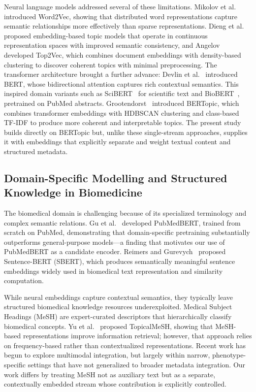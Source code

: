 \documentclass[authorproof,JACIII,researchpaper]{fujipressarticle}
\begin{document}
Neural language models addressed several of these limitations. Mikolov et al.~\cite{mikolov_efficient_2013} introduced Word2Vec, showing that distributed word representations capture semantic relationships more effectively than sparse representations. Dieng et al.~\cite{dieng_topic_2020} proposed embedding-based topic models that operate in continuous representation spaces with improved semantic consistency, and Angelov~\cite{angelov_top2vec_2020} developed Top2Vec, which combines document embeddings with density-based clustering to discover coherent topics with minimal preprocessing. The transformer architecture brought a further advance: Devlin et al.~\cite{devlin_bert_2019} introduced BERT, whose bidirectional attention captures rich contextual semantics. This inspired domain variants such as SciBERT~\cite{beltagy_scibert_2019} for scientific text and BioBERT~\cite{lee_biobert_2020}, pretrained on PubMed abstracts. Grootendorst~\cite{grootendorst_bertopic_2022} introduced BERTopic, which combines transformer embeddings with HDBSCAN clustering and class-based TF-IDF to produce more coherent and interpretable topics. The present study builds directly on BERTopic but, unlike these single-stream approaches, supplies it with embeddings that explicitly separate and weight textual content and structured metadata.

\subsection{Domain-Specific Modelling and Structured Knowledge in Biomedicine}

The biomedical domain is challenging because of its specialized terminology and complex semantic relations. Gu et al.~\cite{gu_domain_2022} developed PubMedBERT, trained from scratch on PubMed, demonstrating that domain-specific pretraining substantially outperforms general-purpose models---a finding that motivates our use of PubMedBERT as a candidate encoder. Reimers and Gurevych~\cite{reimers_sentence-bert_2019} proposed Sentence-BERT (SBERT), which produces semantically meaningful sentence embeddings widely used in biomedical text representation and similarity computation.

While neural embeddings capture contextual semantics, they typically leave structured biomedical knowledge resources underexploited. Medical Subject Headings (MeSH) are expert-curated descriptors that hierarchically classify biomedical concepts. Yu et al.~\cite{yu_improving_2016} proposed TopicalMeSH, showing that MeSH-based representations improve information retrieval; however, that approach relies on frequency-based rather than contextualized representations. Recent work has begun to explore multimodal integration, but largely within narrow, phenotype-specific settings that have not generalized to broader metadata integration. Our work differs by treating MeSH not as auxiliary text but as a separate, contextually embedded stream whose contribution is explicitly controlled.
\end{document}
